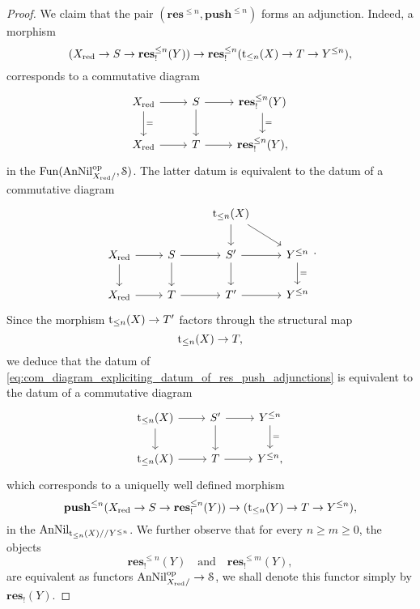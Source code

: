 \documentclass[10pt,a4paper,reqno]{amsart} %
\theoremstyle{plain}
\theoremstyle{definition}
\theoremstyle{remark}
\numberwithin{equation}{section}
\begin{document}
\begin{proof}
    We claim that the pair $(\mathbf{res}^{\le n}, \mathbf{push}^{\le n})$ forms an adjunction. Indeed, a morphism
        \[
            (X_{\mathrm{red}} \to S \to \mathbf{res}^{\le n}_!(Y)) \to \mathbf{res}_!^{\le n}(\mathrm t_{\le n}(X) \to T \to Y^{\le n}),  
        \]
    corresponds to a commutative diagram
        \[
        \begin{tikzcd}
            X_\red \ar{r} \ar{d}{=} & S \ar{r} \ar{d} & \mathbf{res}_!^{\le n}(Y) \ar{d}{=} \\
            X_\red \ar{r} & T \ar{r} & \mathbf{res}_!^{\le n}(Y),
        \end{tikzcd}
        \]
    in the \infcat $\operatorname{Fun}(\mathrm{AnNil}_{X_{\mathrm{red}}/ }^\mathrm{op}, \mathcal S)$. The latter datum is equivalent to the datum of a commutative diagram
        \begin{equation} \label{eq:com_diagram_expliciting_datum_of_res_push_adjunctions}
        \begin{tikzcd}
                                 &                 & \rt_{\le n}(X) \ar{d}   \ar{rd}    &   \\
            X_\red \ar{r} \ar{d} & S \ar{r} \ar{d} & S' \ar{r} \ar{d}                   & Y^{\le n} \ar{d}{=} \\
            X_\red \ar{r}        & T \ar{r}        & T' \ar{r}                          & Y^{\le n}  
        \end{tikzcd}.
        \end{equation}
    Since the morphism $\mathrm t_{\le n}(X) \to T'$ factors through the structural map
        \[
            \mathrm t_{\le n}(X) \to T,  
        \]
    we deduce that the datum of \eqref{eq:com_diagram_expliciting_datum_of_res_push_adjunctions} is equivalent to the datum of a commutative diagram
        \[
        \begin{tikzcd}
            \rt_{\le n}(X) \ar{r} \ar{d} & S' \ar{r} \ar{d} & Y^{\le n} \ar{d}{=} \\
            \rt_{\le n}(X) \ar{r}        & T \ar{r}        & Y^{\le n}, 
        \end{tikzcd}
        \]
    which corresponds to a uniquelly well defined morphism
        \[
            \mathbf{push}^{\le n}(X_{\mathrm{red}} \to S \to \mathbf{res}^{\le n}_!(Y)) \to (\mathrm t_{\le n}(Y) \to T \to Y^{\le n}),
        \]
    in the \infcat $\mathrm{AnNil}_{\mathrm t_{\le n}(X)/ /Y^{\le n}}$. We further observe that for every $n \ge m \ge 0$, the objects
        \[
            \mathbf{res}^{\le n}_!(Y) \quad \mathrm{and} \quad \mathbf{res}^{\le m}_!(Y),  
        \]
    are equivalent as functors $\mathrm{AnNil}_{X_{\mathrm{red}}/ } ^\mathrm{op} \to \mathcal S$, we shall denote this functor simply by $\mathbf{res}_!(Y)$.
    

\end{proof}
\end{document}
